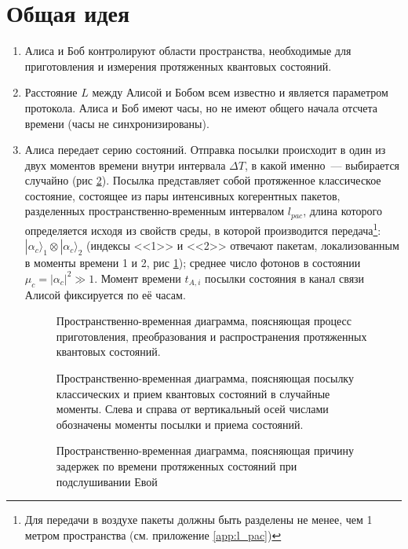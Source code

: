 \section[Общая схема протокола]{Общая идея}\label{sec:common_description}

\begin{enumerate}
  \item Алиса и Боб контролируют области пространства, необходимые для приготовления и измерения протяженных квантовых состояний.
  \item Расстояние $L$ между Алисой и Бобом всем известно и является параметром протокола. Алиса и Боб имеют часы, но не имеют общего начала отсчета времени (часы не синхронизированы).
  \item Алиса передает серию состояний. Отправка посылки происходит в один из двух моментов времени внутри интервала $\Delta T$, в какой именно~--- выбирается случайно (рис \ref{fig:timeline}). 
  Посылка представляет собой протяженное классическое состояние, состоящее из пары интенсивных когерентных пакетов, разделенных пространственно-временным интервалом $l_{pac}$, длина которого определяется исходя из свойств среды, в которой производится передача\footnote{Для передачи в воздухе пакеты должны быть разделены не менее, чем 1 метром пространства (см. приложение \ref{app:l_pac})}: 
  $|\alpha_c\rangle_1 \otimes|\alpha_c\rangle_2$ (индексы <<1>> и <<2>> отвечают пакетам, локализованным в моменты времени 1 и 2, рис \ref{fig:process}); среднее число фотонов в состоянии $\mu_c = |\alpha_c|^2 \gg 1$. 
  Момент времени $t_{A,i}$ посылки состояния в канал связи Алисой фиксируется по её часам.
  
  \begin{figure}[h]
  \caption{Пространственно-временная диаграмма, поясняющая процесс приготовления, преобразования и распространения протяженных квантовых состояний.}
  \label{fig:process}
  \end{figure}
  \begin{figure}[h]
  \caption{Пространственно-временная диаграмма, поясняющая посылку классических и прием квантовых состояний в случайные моменты. Слева и справа от вертикальный осей числами обозначены моменты посылки и приема состояний. }
  \label{fig:timeline}
  \end{figure}
  \begin{figure}[h]
  \caption{Пространственно-временная диаграмма, поясняющая причину задержек по времени протяженных состояний при подслушивании Евой}
  \label{fig:detected}
  \end{figure}
  

\end{enumerate}
